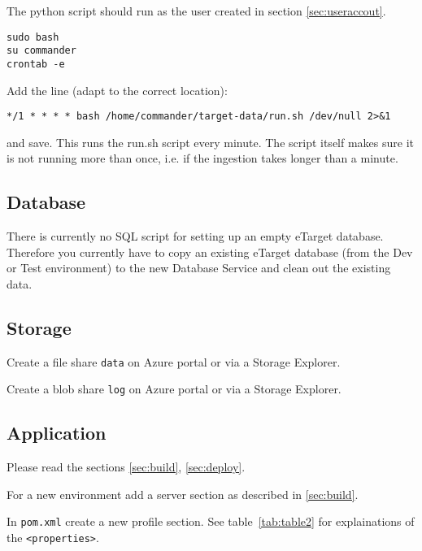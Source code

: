 The python script should run as the user created in section \ref{sec:useraccout}.
\begin{verbatim}
sudo bash
su commander
crontab -e
\end{verbatim}
Add the line (adapt to the correct location):

\verb|*/1 * * * * bash /home/commander/target-data/run.sh /dev/null 2>&1|

and save. This runs the run.sh script every minute. The script itself makes sure it is not running more than once, i.e. if the ingestion takes longer than a minute.

\subsection{Database}
There is currently no SQL script for setting up an empty eTarget database. Therefore you currently have to copy an existing eTarget database 
(from the Dev or Test environment) to the new Database Service and clean out the existing data. 

\subsection{Storage}
Create a file share \verb|data| on Azure portal or via a Storage Explorer.

Create a blob share \verb|log| on Azure portal or via a Storage Explorer.

\subsection{Application}

Please read the sections \ref{sec:build}, \ref{sec:deploy}.

For a new environment add a server section as described in \ref{sec:build}.

In \verb|pom.xml| create a new profile section. See table~\ref{tab:table2} for explainations of the \verb|<properties>|.

